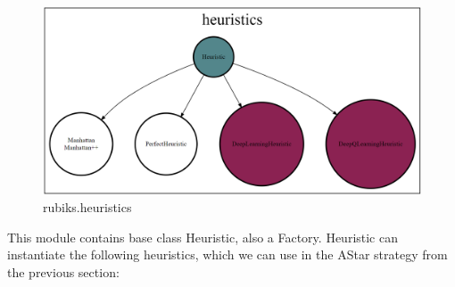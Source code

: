 \begin{figure}[H]
\centering
\includegraphics[scale=0.22]{./Figures/codebaseheuristics}
\caption[Codebase]{rubiks.heuristics}
\label{fig:Codebaseheuristics}
\end{figure}
\label{HSS}
This module contains base class Heuristic, also a Factory. Heuristic can instantiate the following heuristics, which we can use in the AStar strategy from the previous section:
